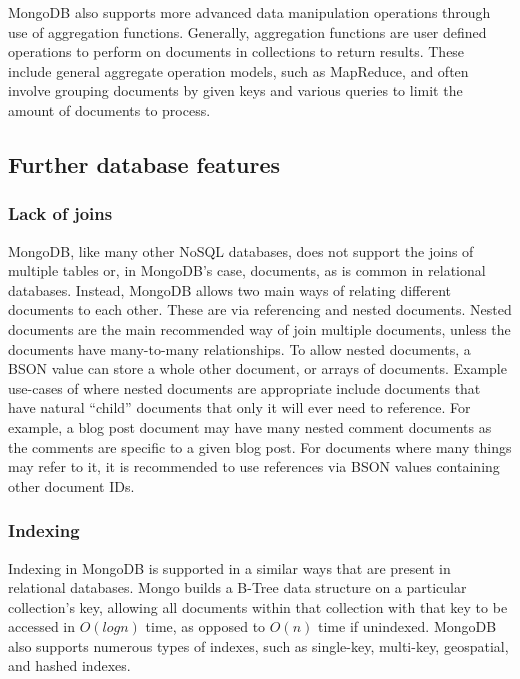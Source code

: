 \documentclass[a4paper,11pt]{article}
\begin{document}
MongoDB also supports more advanced data manipulation operations through use of aggregation functions. Generally, aggregation
functions are user defined operations to perform on documents in collections to return results. These include general
aggregate operation models, such as MapReduce, and often involve grouping documents by given keys and various queries
to limit the amount of documents to process.



\subsection{Further database features} %
\label{sub:further_database_features}

\subsubsection{Lack of joins} %
\label{ssub:joins}

MongoDB, like many other NoSQL databases, does not support the joins of multiple tables or, in MongoDB's case, documents,
as is common in relational databases.
Instead, MongoDB allows two main ways of relating different documents to each other. These are via referencing and
nested documents. Nested documents are the main recommended way of join multiple documents, unless the documents have
many-to-many relationships. To allow nested documents, a BSON value can store a whole other document, or arrays of documents.
Example use-cases of where nested documents are appropriate include documents that have natural ``child'' documents that
only it will ever need to reference. For example, a blog post document may have many nested comment documents as the
comments are specific to a given blog post. For documents where many things may refer to it, it is recommended to use
references via BSON values containing other document IDs.


\subsubsection{Indexing} %
\label{ssub:indexing}

Indexing in MongoDB is supported in a similar ways that are present in relational databases. Mongo builds a B-Tree data
structure on a particular collection's key, allowing all documents within that collection with that key to be accessed
in $O(log n)$ time, as opposed to $O(n)$ time if unindexed. MongoDB also supports numerous types of indexes, such as
single-key, multi-key, geospatial, and hashed indexes.
\end{document}
